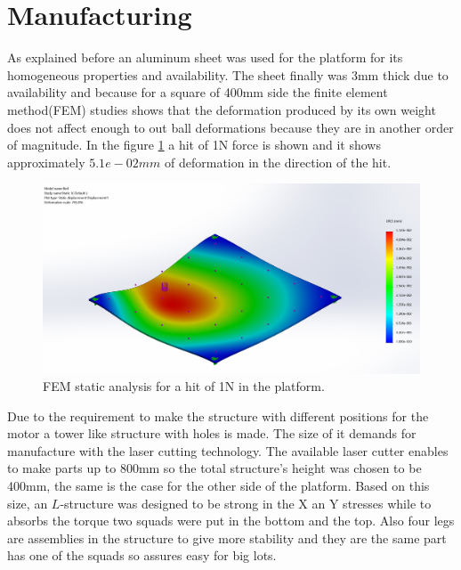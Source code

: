 	\section{Manufacturing} %
	\label{sec:mechanics_manufacturing}
		As explained before an aluminum sheet was used for the platform for its homogeneous properties and availability. 
		The sheet finally was 3\si{mm} thick due to availability and because for a square of 400\si{mm} side the finite element method(FEM) studies shows that the deformation produced by its own weight does not affect enough to out ball deformations because they are in another order of magnitude. 
		In the figure \ref{fig:FEM} a hit of 1\si{N} force is shown and it shows approximately $5.1e-02\si{mm}$ of deformation in the direction of the hit.
		\begin{figure}[!ht]
			\begin{center}
				\includegraphics[width=.8\textwidth]{figures/FEM}
			\end{center}
			\caption{FEM static analysis for a hit of 1\si{N} in the platform.}
			\label{fig:FEM}
		\end{figure}
		Due to the requirement to make the structure with different positions for the motor a tower like structure with holes is made. The size of it demands for manufacture with the laser cutting technology. 
		The available laser cutter enables to make parts up to 800\si{mm} so the total structure's height was chosen to be 400\si{mm}, the same is the case for the other side of the platform. 
		Based on this size, an $L$-structure was designed to be strong in the X an Y stresses while to absorbs the torque two squads were put in the bottom and the top.
		Also four legs are assemblies in the structure to give more stability and they are the same part has one of the squads so assures easy for big lots.
		

